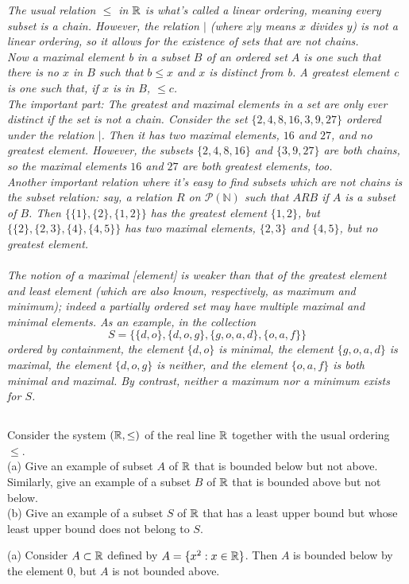 \textit{The usual relation $\leq$ in $\mathbb{R}$ is what's called a linear ordering, meaning every subset is a chain. However, the relation $|$ (where $x|y$ means $x$ divides $y$) is not a linear ordering, so it allows for the existence of sets that are not chains.}\\

\textit{Now a maximal element b in a subset $B$ of an ordered set $A$ is one such that there is no $x$ in $B$ such that $b\leq x$ and $x$ is distinct from b. A greatest element c is one such that, if $x$ is in $B$, $\leq c$.}\\

\textit{The important part: The greatest and maximal elements in a set are only ever distinct if the set is not a chain. Consider the set $\{2, 4, 8, 16, 3, 9, 27\}$ ordered under the relation $|$. Then it has two maximal elements, $16$ and $27$, and no greatest element. However, the subsets $\{2, 4, 8, 16\}$ and $\{3, 9, 27\}$ are both chains, so the maximal elements $16$ and $27$ are both greatest elements, too.}\\

\textit{Another important relation where it's easy to find subsets which are not chains is the subset relation: say, a relation $R$ on $\mathscr{P}(\mathbb{N})$ such that $ARB$ if $A$ is a subset of $B$. Then $\{\{1\},\{2\},\{1,2\}\}$ has the greatest element $\{1,2\}$, but $\{\{2\},\{2,3\},\{4\},\{4,5\}\}$ has two maximal elements, $\{2,3\}$ and $\{4,5\}$, but no greatest element.}\\\\

\textit{The notion of a maximal [element] is weaker than that of the greatest element and least element (which are also known, respectively, as maximum and minimum); indeed a partially ordered set may have multiple maximal and minimal elements. As an example, in the collection
$$S = \{\{d, o\}, \{d, o, g\}, \{g, o, a, d\}, \{o, a, f\}\}$$
ordered by containment, the element $\{d, o\}$ is minimal, the element $\{g, o, a, d\}$ is maximal, the element $\{d, o, g\}$ is neither, and the element $\{o, a, f\}$ is both minimal and maximal. By contrast, neither a maximum nor a minimum exists for $S$.}
\subsection{}
\begin{tcolorbox}
Consider the system $(\mathbb{R}, \leq )$ of the real line $\mathbb{R}$ together with the usual ordering $\leq $.\\
 (a) Give an example of subset $A$ of $\mathbb{R}$  that is bounded below but not above. Similarly, give an example of a subset $B$ of $\mathbb{R}$ that is bounded above but not below.\\
(b) Give an example of a subset $S$ of $\mathbb{R}$ that has a least upper bound but whose least upper bound does not belong to $S$. 
\end{tcolorbox}
$$ $$
(a) Consider $A\subset \mathbb{R}$ defined by $A=\{x^2:x\in \mathbb{R}\}$.
Then $A$ is bounded below by the element $0$, but $A$ is not bounded above. \\\\


